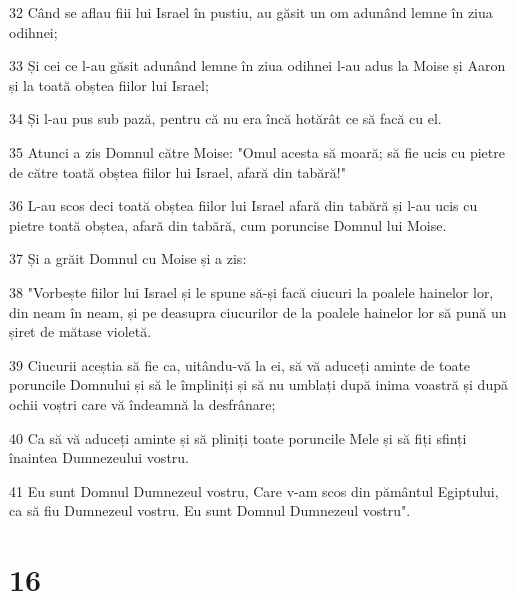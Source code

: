 \par 32 Când se aflau fiii lui Israel în pustiu, au găsit un om adunând lemne în ziua odihnei;
\par 33 Și cei ce l-au găsit adunând lemne în ziua odihnei l-au adus la Moise și Aaron și la toată obștea fiilor lui Israel;
\par 34 Și l-au pus sub pază, pentru că nu era încă hotărât ce să facă cu el.
\par 35 Atunci a zis Domnul către Moise: "Omul acesta să moară; să fie ucis cu pietre de către toată obștea fiilor lui Israel, afară din tabără!"
\par 36 L-au scos deci toată obștea fiilor lui Israel afară din tabără și l-au ucis cu pietre toată obștea, afară din tabără, cum poruncise Domnul lui Moise.
\par 37 Și a grăit Domnul cu Moise și a zis:
\par 38 "Vorbește fiilor lui Israel și le spune să-și facă ciucuri la poalele hainelor lor, din neam în neam, și pe deasupra ciucurilor de la poalele hainelor lor să pună un șiret de mătase violetă.
\par 39 Ciucurii aceștia să fie ca, uitându-vă la ei, să vă aduceți aminte de toate poruncile Domnului și să le împliniți și să nu umblați după inima voastră și după ochii voștri care vă îndeamnă la desfrânare;
\par 40 Ca să vă aduceți aminte și să pliniți toate poruncile Mele și să fiți sfinți înaintea Dumnezeului vostru.
\par 41 Eu sunt Domnul Dumnezeul vostru, Care v-am scos din pământul Egiptului, ca să fiu Dumnezeul vostru. Eu sunt Domnul Dumnezeul vostru".

\chapter{16}

